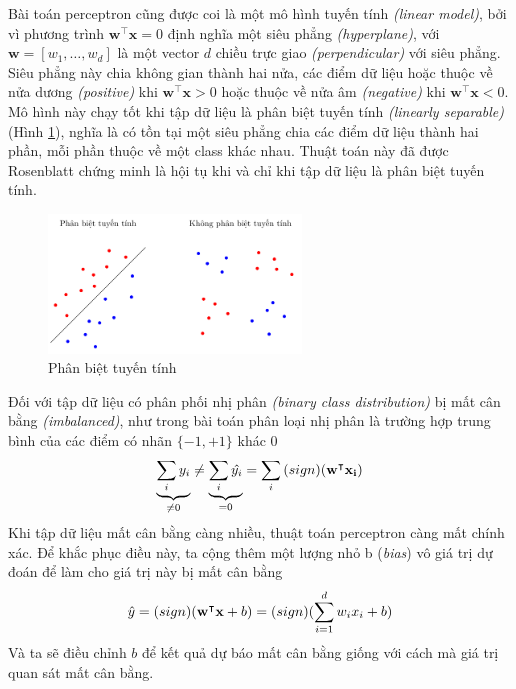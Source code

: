 Bài toán perceptron cũng được coi là một mô hình tuyến tính \textit{(linear model)}, bởi vì phương trình $\mathbf{w^\intercal x}=0$ định nghĩa một siêu phẳng \textit{(hyperplane)}, với $\mathbf{w}=[w_1,\dots,w_d]$ là một vector $d$ chiều trực giao \textit{(perpendicular)} với siêu phẳng. Siêu phẳng này chia không gian thành hai nửa, các điểm dữ liệu hoặc thuộc về nửa dương \textit{(positive)} khi $\mathbf{w^\intercal x}>0$ hoặc thuộc về nửa âm \textit{(negative)} khi $\mathbf{w^\intercal x}<0$. Mô hình này chạy tốt khi tập dữ liệu là phân biệt tuyến tính \textit{(linearly separable)} (Hình \ref{figure:linearly-separable}), nghĩa là có tồn tại một siêu phẳng chia các điểm dữ liệu thành hai phần, mỗi phần thuộc về một class khác nhau. Thuật toán này đã được Rosenblatt chứng minh là hội tụ khi và chỉ khi tập dữ liệu là phân biệt tuyến tính.\cite{Aggarwal2023}
\begin{figure}[htbp]
    \centering
    \includegraphics[width=0.6\textwidth]{tikz_image/linearly_separable.pdf}
    \caption{Phân biệt tuyến tính}
    \label{figure:linearly-separable}
\end{figure}

Đối với tập dữ liệu có phân phối nhị phân \textit{(binary class distribution)} bị mất cân bằng \textit{(imbalanced)}, như trong bài toán phân loại nhị phân là trường hợp trung bình của các điểm có nhãn $\{-1, +1\}$ khác $0$
\begin{align}
    \underbrace{\sum_i y_i}_{\neq 0}\neq\underbrace{\sum_i\hat{y_i}}_{=0}=\sum_i\text(sign)(\mathbf{w}^\intercal\mathbf{x_i})
\end{align}
Khi tập dữ liệu mất cân bằng càng nhiều, thuật toán perceptron càng mất chính xác. Để khắc phục điều này, ta cộng thêm một lượng nhỏ b (\textit{bias}) vô giá trị dự đoán để làm cho giá trị này bị mất cân bằng
\begin{align}
    \hat{y}=\text(sign)(\mathbf{w^\intercal x}+b)=\text(sign)(\sum^d_{i=1}w_ix_i+b)
\end{align}
Và ta sẽ điều chỉnh $b$ để kết quả dự báo mất cân bằng giống với cách mà giá trị quan sát mất cân bằng.


